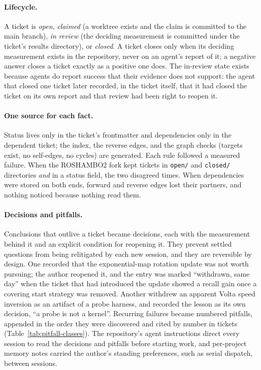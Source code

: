 \paragraph{Lifecycle.} A ticket is \emph{open}, \emph{claimed} (a worktree
exists and the claim is committed to the main branch), \emph{in review} (the
deciding measurement is committed under the ticket's results directory), or
\emph{closed}. A ticket closes only when its deciding measurement exists in the
repository, never on an agent's report of it; a negative answer closes a
ticket exactly as a positive one does. The in-review state exists because
agents do report success that their evidence does not support: the agent that
closed one ticket later recorded, in the ticket itself, that it had closed the
ticket on its own report and that review had been right to reopen it.

\paragraph{One source for each fact.} Status lives only in the ticket's
frontmatter and dependencies only in the dependent ticket; the index, the
reverse edges, and the graph checks (targets exist, no self-edges, no cycles)
are generated. Each rule followed a measured failure. When the ROSHAMBO2 fork
kept tickets in \texttt{open/} and \texttt{closed/} directories \emph{and} in a
status field, the two disagreed \StatusDriftCount{} times. When dependencies
were stored on both ends, \OneSidedBlocksEdges{} forward and
\OneSidedDependsEdges{} reverse edges lost their partners, and nothing noticed
because nothing read them.

\paragraph{Decisions and pitfalls.} Conclusions that outlive a ticket became
decisions, each with the measurement behind it and an explicit condition for
reopening it. They prevent settled questions from being relitigated by each
new session, and they are reversible by design. One recorded that the
exponential-map rotation update was not worth pursuing; the author reopened it,
and the entry was marked ``withdrawn, same day'' when the ticket that had
introduced the update showed a \ExpMapRecallGain{} recall gain once a covering
start strategy was removed. Another withdrew an apparent Volta speed inversion
as an artifact of a probe harness, and recorded the lesson as its own decision,
``a probe is not a kernel''.
Recurring failures became numbered pitfalls, appended in the order they were
discovered and cited by number in tickets (Table~\ref{tab:pitfall-classes}).
The repository's agent instructions direct every session to read the decisions
and pitfalls before starting work, and per-project memory notes carried the
author's standing preferences, such as serial dispatch, between sessions.

